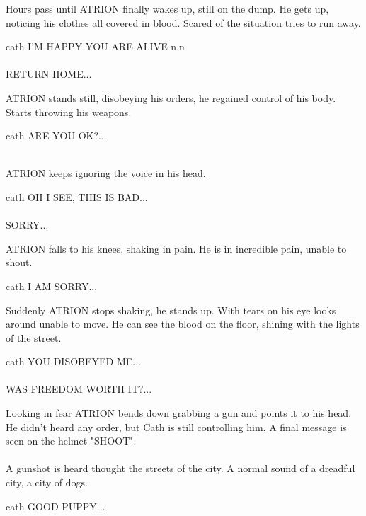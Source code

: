 \documentclass{screenplay}
\begin{document}
Hours pass until ATRION finally wakes up, still on the dump. He gets up, noticing his clothes all covered in blood. Scared of the situation tries to run away.

\begin{dialogue}{cath}
I'M HAPPY YOU ARE ALIVE n.n\\~\\
RETURN HOME...
\end{dialogue}
ATRION stands still, disobeying his orders, he regained control of his body. Starts throwing his weapons.
\begin{dialogue}{cath}
ARE YOU OK?...\\~\\
\end{dialogue}
ATRION keeps ignoring the voice in his head.

\begin{dialogue}{cath}
OH I SEE, THIS IS BAD...\\~\\
SORRY...
\end{dialogue}

ATRION falls to his knees, shaking in pain. He is in incredible pain, unable to shout.

\begin{dialogue}{cath}
I AM SORRY...
\end{dialogue}

Suddenly ATRION stops shaking, he stands up. With tears on his eye looks around unable to move. He can see the blood on the floor, shining with the lights of the street.

\begin{dialogue}{cath}
YOU DISOBEYED ME...\\~\\
WAS FREEDOM WORTH IT?...
\end{dialogue}

Looking in fear ATRION bends down grabbing a gun and points it to his head. He didn't heard any order, but Cath is still controlling him.
A final message is seen on the helmet "SHOOT".
\\~\\
A gunshot is heard thought the streets of the city. A normal sound of a dreadful city, a city of dogs.

\begin{dialogue}{cath}
GOOD PUPPY...
\end{dialogue}
\end{document}
